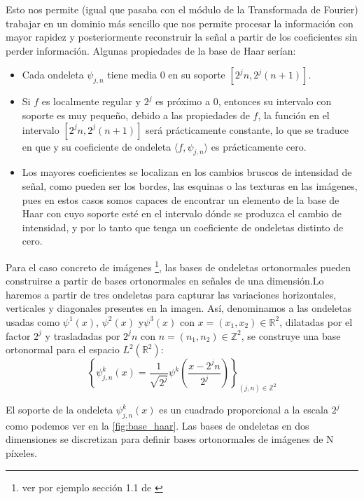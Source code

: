 \noindent Esto nos permite (igual que pasaba con el módulo de la Transformada de Fourier) trabajar en un dominio más sencillo que nos permite procesar la información con mayor rapidez y posteriormente reconstruir la señal a partir de los coeficientes sin perder información. Algunas propiedades de la base de Haar serían: 

\newpage

\begin{itemize}
  \item Cada ondeleta $\psi_{j,n}$ tiene media $0$ en su soporte $[2^jn, 2^j(n+1)]$.
  \item Si $f$ es localmente regular y $2^j$ es próximo a $0$, entonces su intervalo con soporte es muy pequeño, debido a las propiedades de $f$, la función en el intervalo  $[2^jn, 2^j(n+1)]$ será prácticamente constante, lo que se traduce en que  y su coeficiente de ondeleta $\langle f,\psi_{j,n} \rangle$ es prácticamente cero.
  \item Los mayores coeficientes se localizan en los cambios bruscos de intensidad de señal, como pueden ser los bordes, las esquinas o las texturas en las imágenes, pues en estos casos somos capaces de encontrar un elemento de la base de Haar con cuyo soporte esté en el intervalo dónde se produzca el cambio de intensidad, y por lo tanto que tenga un coeficiente de ondeletas distinto de cero.
\end{itemize}

\noindent Para el caso concreto de imágenes \footnote{ver por ejemplo sección 1.1 de \cite{MallatWavelets}}, las bases de ondeletas ortonormales pueden construirse a partir de bases ortonormales en señales de una dimensión.Lo haremos a partir de tres ondeletas para capturar las variaciones horizontales, verticales y diagonales presentes en la imagen. Así, denominamos a las ondeletas usadas como $\psi^1(x)$, $\psi^2(x)$ y$\psi^3(x)$ con $x=(x_1,x_2)\in \mathbb{R}^2$, dilatadas por el factor $2^j$ y trasladadas por $2^jn$ con $n=(n_1,n_2) \in \mathbb{Z}^2$, se construye una base ortonormal para el espacio $L^2(\mathbb{R}^2)$: 
$$\left \lbrace \psi_{j,n}^k(x)= \frac{1}{\sqrt{2^j}} \psi^k\left(\frac{x-2^jn}{2^j}\right) \right \rbrace_{(j,n) \in \mathbb{Z}^2}$$

\medskip

\noindent El soporte de la ondeleta $\psi_{j,n}^k(x)$ es un cuadrado proporcional a la escala $2^j$ como podemos ver en la \autoref{fig:base_haar}. Las bases de ondeletas en dos dimensiones se discretizan para definir bases ortonormales de imágenes de N píxeles.


